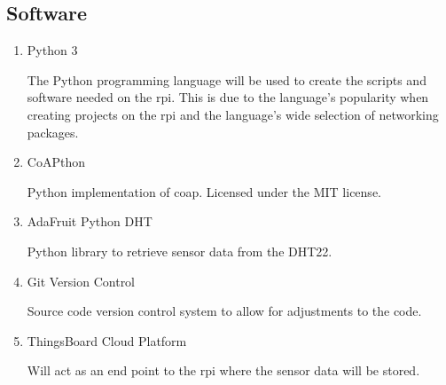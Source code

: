 
    
    
    


\subsection{Software}
\begin{enumerate}
    \item Python 3

        The Python programming language will be used to create the scripts and software needed on the \gls{rpi}.
        This is due to the language's popularity when creating projects on the \gls{rpi} and the language's wide selection
        of networking packages.
    \item CoAPthon
    
        Python implementation of \gls{coap}. Licensed under the MIT license. %

    \item AdaFruit Python DHT
        
        Python library to retrieve sensor data from the DHT22. %

    \item Git Version Control
    
        Source code version control system to allow for adjustments to the code.

    \item ThingsBoard Cloud Platform
    
        Will act as an end point to the \gls{rpi} where the sensor data will be stored. %
\end{enumerate}
